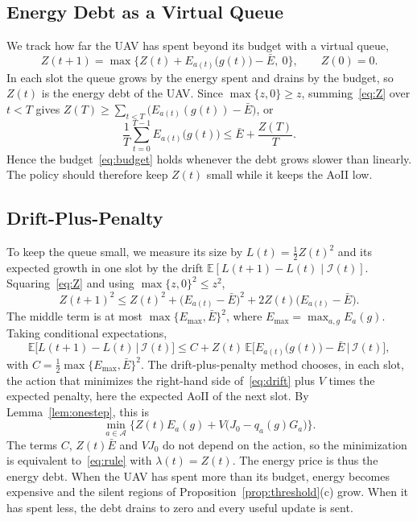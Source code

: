 \documentclass[journal]{IEEEtran}
\theoremstyle{remark}
\newcommand{\E}{\mathbb{E}}
\newcommand{\A}{\mathcal{A}}
\newcommand{\I}{\mathcal{I}}
\begin{document}
\subsection{Energy Debt as a Virtual Queue}
We track how far the UAV has spent beyond its budget with a virtual queue,
\begin{equation}\label{eq:Z}
Z(t+1)=\max\Big\{Z(t)+E_{a(t)}\big(g(t)\big)-\bar E,\ 0\Big\},\qquad Z(0)=0.
\end{equation}
In each slot the queue grows by the energy spent and drains by the budget, so $Z(t)$ is the energy debt of the UAV. Since $\max\{z,0\}\ge z$, summing~\eqref{eq:Z} over $t<T$ gives $Z(T)\ge\sum_{t<T}\big(E_{a(t)}(g(t))-\bar E\big)$, or
\begin{equation}\label{eq:Zbound}
\frac1T\sum_{t=0}^{T-1}E_{a(t)}\big(g(t)\big)\le\bar E+\frac{Z(T)}{T}.
\end{equation}
Hence the budget~\eqref{eq:budget} holds whenever the debt grows slower than linearly. The policy should therefore keep $Z(t)$ small while it keeps the AoII low.

\subsection{Drift-Plus-Penalty}
To keep the queue small, we measure its size by $L(t)=\frac12Z(t)^2$ and its expected growth in one slot by the drift $\E[L(t+1)-L(t)\mid\I(t)]$. Squaring~\eqref{eq:Z} and using $\max\{z,0\}^2\le z^2$,
\[
Z(t+1)^2\le Z(t)^2+\big(E_{a(t)}-\bar E\big)^2+2Z(t)\big(E_{a(t)}-\bar E\big).
\]
The middle term is at most $\max\{E_{\max},\bar E\}^2$, where $E_{\max}=\max_{a,g}E_a(g)$. Taking conditional expectations,
\begin{equation}\label{eq:drift}
\E\big[L(t+1)-L(t)\,|\,\I(t)\big]\le C+Z(t)\,\E\Big[E_{a(t)}\big(g(t)\big)-\bar E\,\big|\,\I(t)\Big],
\end{equation}
with $C=\frac12\max\{E_{\max},\bar E\}^2$. The drift-plus-penalty method chooses, in each slot, the action that minimizes the right-hand side of~\eqref{eq:drift} plus $V$ times the expected penalty, here the expected AoII of the next slot. By Lemma~\ref{lem:onestep}, this is
\[
\min_{a\in\A}\Big\{Z(t)E_a(g)+V\big(J_0-q_a(g)G_a\big)\Big\}.
\]
The terms $C$, $Z(t)\bar E$ and $VJ_0$ do not depend on the action, so the minimization is equivalent to~\eqref{eq:rule} with $\lambda(t)=Z(t)$. The energy price is thus the energy debt. When the UAV has spent more than its budget, energy becomes expensive and the silent regions of Proposition~\ref{prop:threshold}(c) grow. When it has spent less, the debt drains to zero and every useful update is sent.
\end{document}
